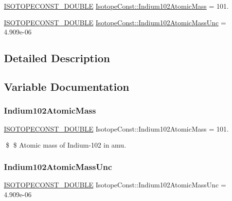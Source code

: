 \begin{DoxyCompactItemize}
\item 
\mbox{\hyperlink{group___isotope_const-_macros_ga8f45a7272ce02c0b4c65c44636ed719a}{I\+S\+O\+T\+O\+P\+E\+C\+O\+N\+S\+T\+\_\+\+D\+O\+U\+B\+LE}} \mbox{\hyperlink{group___isotope_const-_indium-_in102_ga8ec495f22bc73ef2df705f3363b79808}{Isotope\+Const\+::\+Indium102\+Atomic\+Mass}} = 101.
\item 
\mbox{\hyperlink{group___isotope_const-_macros_ga8f45a7272ce02c0b4c65c44636ed719a}{I\+S\+O\+T\+O\+P\+E\+C\+O\+N\+S\+T\+\_\+\+D\+O\+U\+B\+LE}} \mbox{\hyperlink{group___isotope_const-_indium-_in102_ga9af9aebfa342ec245b274130f395765c}{Isotope\+Const\+::\+Indium102\+Atomic\+Mass\+Unc}} = 4.\+909e-\/06
\end{DoxyCompactItemize}


\subsection{Detailed Description}


\subsection{Variable Documentation}
\mbox{\label{group___isotope_const-_indium-_in102_ga8ec495f22bc73ef2df705f3363b79808}} 
\subsubsection{\texorpdfstring{Indium102\+Atomic\+Mass}{Indium102AtomicMass}}
{\footnotesize\ttfamily \mbox{\hyperlink{group___isotope_const-_macros_ga8f45a7272ce02c0b4c65c44636ed719a}{I\+S\+O\+T\+O\+P\+E\+C\+O\+N\+S\+T\+\_\+\+D\+O\+U\+B\+LE}} Isotope\+Const\+::\+Indium102\+Atomic\+Mass = 101.}

\$ \$ Atomic mass of Indium-\/102 in amu. \mbox{\label{group___isotope_const-_indium-_in102_ga9af9aebfa342ec245b274130f395765c}} 
\subsubsection{\texorpdfstring{Indium102\+Atomic\+Mass\+Unc}{Indium102AtomicMassUnc}}
{\footnotesize\ttfamily \mbox{\hyperlink{group___isotope_const-_macros_ga8f45a7272ce02c0b4c65c44636ed719a}{I\+S\+O\+T\+O\+P\+E\+C\+O\+N\+S\+T\+\_\+\+D\+O\+U\+B\+LE}} Isotope\+Const\+::\+Indium102\+Atomic\+Mass\+Unc = 4.\+909e-\/06}

